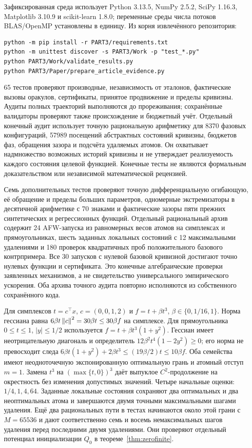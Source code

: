 Зафиксированная среда использует Python 3.13.5, NumPy 2.5.2,
SciPy 1.16.3, Matplotlib 3.10.9 и scikit-learn 1.8.0;
переменные среды числа потоков BLAS/OpenMP установлены в единицу.
Из корня извлечённого репозитория:
\begin{verbatim}
python -m pip install -r PART3/requirements.txt
python -m unittest discover -s PART3/Work -p "test_*.py"
python PART3/Work/validate_results.py
python PART3/Paper/prepare_article_evidence.py
\end{verbatim}
65 тестов проверяют производные, независимость от эталонов,
фактические вызовы оракулов, сертификаты, принятое продвижение и
пределы кривизны. Аудиты полных траекторий выполняются до
прореживания; сохранённые валидаторы проверяют также происхождение
и бюджетный учёт. Отдельный конечный аудит использует точную
рациональную арифметику для 8370 фазовых конфигураций, 57989
посещений абстрактных состояний кривизны, бюджетов фаз, обращения
зазора и подсчёта удаляемых атомов. Он охватывает надмножество
возможных историй кривизны и не утверждает реализуемость каждого
состояния целевой функцией. Конечные тесты не являются формальным
доказательством или независимой математической рецензией.

Семь дополнительных тестов проверяют точную дифференциальную
огибающую, её обращение и пределы больших параметров, одномерные
экстремизаторы в десятичной арифметике с 70 знаками и фактические
зазоры пяти прежних синтетических и регрессионных функций.
Отдельный рациональный архив содержит 24 AFW-запуска из равномерных
весов атомов на симплексах и прямоугольниках, шесть заданных локальных
состояний с 12 максимальными удалениями и 180 проверок квадратичных
проб положительного базового контрпримера. Все 30 запусков с нулевой
базовой кривизной достигают точно нулевых функции и сертификата.
Это конечные алгебраические проверки заявленных механизмов, а не
свидетельство универсального эмпирического ускорения. Оба архива
точного аудита повторно исполняются из собственного сохранённого кода.

Для симплексов $t=c^\top x$, $c=(0,0,1,2)$ и
$f=t+\beta t^3$, $\beta\in\{0,1/16,1\}$. Норма гессиана равна
$6\beta t\left\|c\right\|^2=30\beta t\le30\beta f$ на симплексе.
Для прямоугольника $0\le t\le1$, $|y|\le1/2$ используется
$f=t+\beta t^3(1+y^2)$. Гессиан имеет неотрицательную диагональ и
определитель $12\beta^2t^4(1-2y^2)\ge0$; его норма не превосходит
следа $6\beta t(1+y^2)+2\beta t^3\le(19\beta/2)t\le10\beta f$.
Оба семейства имеют неодноточечную экспонированную оптимальную грань
и атомный отступ $m=1$. Замена $t^3$ на $(\max\{t,0\})^3$
даёт выпуклое $C^2$-продолжение на окрестность без изменения
допустимых значений. Четыре начальные оценки: $1/4,1,4,64$.
Заданные локальные состояния сохраняют два оптимальных и два
неоптимальных атома и завершаются двумя точными максимальными
шагами удаления. Ещё два рациональных пути в тестах начинаются
около этой грани с $M=65536$ и дают соответственно семь и восемь
немаксимальных шагов удаления перед последними двумя удалениями.
Они проверяют отдельный потенциал инициализации $Q_0$ в
теореме~\ref{thm:zerofinite}.

